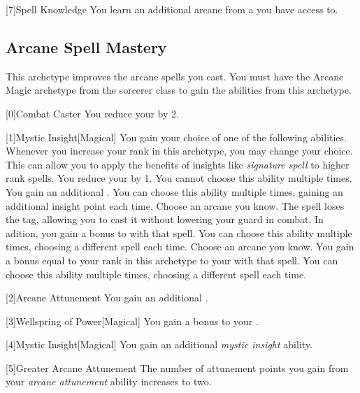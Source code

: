         [7]{Spell Knowledge} You learn an additional arcane  from a  you have access to.

    \newpage
    \subsection{Arcane Spell Mastery}
        This archetype improves the arcane spells you cast.
        You must have the Arcane Magic archetype from the sorcerer class to gain the abilities from this archetype.

        [0]{Combat Caster} You reduce your  by 2.

        [1]{Mystic Insight}[Magical]
        You gain your choice of one of the following abilities.
        Whenever you increase your rank in this archetype, you may change your choice.
        This can allow you to apply the benefits of insights like \textit{signature spell} to higher rank spells.
        {
             You reduce your  by 1.
                You cannot choose this ability multiple times.
             You gain an additional .
                You can choose this ability multiple times, gaining an additional insight point each time.
             Choose an arcane  you know.
                The spell loses the  tag, allowing you to cast it without lowering your guard in combat.
                In adition, you gain a  bonus to  with that spell.
                You can choose this ability multiple times, choosing a different spell each time.
             Choose an arcane  you know.
                You gain a bonus equal to your rank in this archetype to your  with that spell.
                You can choose this ability multiple times, choosing a different spell each time.
        }

        [2]{Arcane Attunement} You gain an additional .

        [3]{Wellspring of Power}[Magical]
        You gain a  bonus to your  .

        [4]{Mystic Insight}[Magical]
        You gain an additional \textit{mystic insight} ability.

        [5]{Greater Arcane Attunement} The number of attunement points you gain from your \textit{arcane attunement} ability increases to two.

